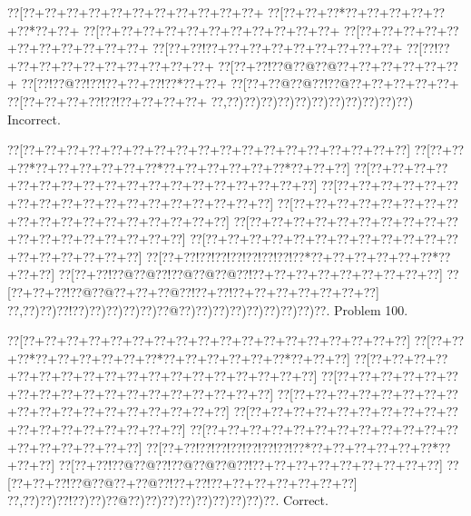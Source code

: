 \documentclass[a5paper]{article}
\begin{document}
\begin{center}
{\goo
\0??[\0??+\0??+\0??+\0??+\0??+\0??+\0??+\0??+\0??+\0??+\0??+
\0??[\0??+\0??+\0??*\0??+\0??+\0??+\0??+\0??+\0??*\0??+\0??+
\0??[\0??+\0??+\0??+\0??+\0??+\0??+\0??+\0??+\0??+\0??+\0??+
\0??[\0??+\0??+\0??+\0??+\0??+\0??+\0??+\0??+\0??+\0??+\0??+
\0??[\0??+\0??!\0??+\0??+\0??+\0??+\0??+\0??+\0??+\0??+\0??+
\0??[\0??!\0??+\0??+\0??+\0??+\0??+\0??+\0??+\0??+\0??+\0??+
\0??[\0??+\0??!\0??@\0??@\0??@\0??+\0??+\0??+\0??+\0??+\0??+
\0??[\0??!\0??@\0??!\0??!\0??+\0??+\0??!\0??*\0??+\0??+
\0??[\0??+\0??@\0??@\0??!\0??@\0??+\0??+\0??+\0??+\0??+
\0??[\0??+\0??+\0??+\0??!\0??!\0??+\0??+\0??+\0??+
\0??,\0??)\0??)\0??)\0??)\0??)\0??)\0??)\0??)\0??)\0??)\0??)
}
Incorrect. 

\end{center}
\newpage
\begin{center}
{\goo
\0??[\0??+\0??+\0??+\0??+\0??+\0??+\0??+\0??+\0??+\0??+\0??+\0??+\0??+\0??+\0??+\0??+\0??+\0??]
\0??[\0??+\0??+\0??*\0??+\0??+\0??+\0??+\0??+\0??*\0??+\0??+\0??+\0??+\0??+\0??*\0??+\0??+\0??]
\0??[\0??+\0??+\0??+\0??+\0??+\0??+\0??+\0??+\0??+\0??+\0??+\0??+\0??+\0??+\0??+\0??+\0??+\0??]
\0??[\0??+\0??+\0??+\0??+\0??+\0??+\0??+\0??+\0??+\0??+\0??+\0??+\0??+\0??+\0??+\0??+\0??+\0??]
\0??[\0??+\0??+\0??+\0??+\0??+\0??+\0??+\0??+\0??+\0??+\0??+\0??+\0??+\0??+\0??+\0??+\0??+\0??]
\0??[\0??+\0??+\0??+\0??+\0??+\0??+\0??+\0??+\0??+\0??+\0??+\0??+\0??+\0??+\0??+\0??+\0??+\0??]
\0??[\0??+\0??+\0??+\0??+\0??+\0??+\0??+\0??+\0??+\0??+\0??+\0??+\0??+\0??+\0??+\0??+\0??+\0??]
\0??[\0??+\0??!\0??!\0??!\0??!\0??!\0??!\0??!\0??*\0??+\0??+\0??+\0??+\0??+\0??*\0??+\0??+\0??]
\0??[\0??+\0??!\0??@\0??@\0??!\0??@\0??@\0??@\0??!\0??+\0??+\0??+\0??+\0??+\0??+\0??+\0??+\0??]
\0??[\0??+\0??+\0??!\0??@\0??@\0??+\0??+\0??@\0??!\0??+\0??!\0??+\0??+\0??+\0??+\0??+\0??+\0??]
\0??,\0??)\0??)\0??!\0??)\0??)\0??)\0??)\0??)\0??@\0??)\0??)\0??)\0??)\0??)\0??)\0??)\0??)\0??.
}
Problem 100.

\end{center}
\begin{center}
{\goo
\0??[\0??+\0??+\0??+\0??+\0??+\0??+\0??+\0??+\0??+\0??+\0??+\0??+\0??+\0??+\0??+\0??+\0??+\0??]
\0??[\0??+\0??+\0??*\0??+\0??+\0??+\0??+\0??+\0??*\0??+\0??+\0??+\0??+\0??+\0??*\0??+\0??+\0??]
\0??[\0??+\0??+\0??+\0??+\0??+\0??+\0??+\0??+\0??+\0??+\0??+\0??+\0??+\0??+\0??+\0??+\0??+\0??]
\0??[\0??+\0??+\0??+\0??+\0??+\0??+\0??+\0??+\0??+\0??+\0??+\0??+\0??+\0??+\0??+\0??+\0??+\0??]
\0??[\0??+\0??+\0??+\0??+\0??+\0??+\0??+\0??+\0??+\0??+\0??+\0??+\0??+\0??+\0??+\0??+\0??+\0??]
\0??[\0??+\0??+\0??+\0??+\0??+\0??+\0??+\0??+\0??+\0??+\0??+\0??+\0??+\0??+\0??+\0??+\0??+\0??]
\0??[\0??+\0??+\0??+\0??+\0??+\0??+\0??+\0??+\0??+\0??+\0??+\0??+\0??+\0??+\0??+\0??+\0??+\0??]
\0??[\0??+\0??!\0??!\0??!\0??!\0??!\0??!\0??!\0??*\0??+\0??+\0??+\0??+\0??+\0??*\0??+\0??+\0??]
\0??[\0??+\0??!\0??@\0??@\0??!\0??@\0??@\0??@\0??!\0??+\0??+\0??+\0??+\0??+\0??+\0??+\0??+\0??]
\0??[\0??+\0??+\0??!\0??@\0??@\0??+\0??@\0??!\0??+\0??!\0??+\0??+\0??+\0??+\0??+\0??+\0??]
\0??,\0??)\0??)\0??!\0??)\0??)\0??@\0??)\0??)\0??)\0??)\0??)\0??)\0??)\0??)\0??.
}
Correct. 

\end{center}
\end{document}
